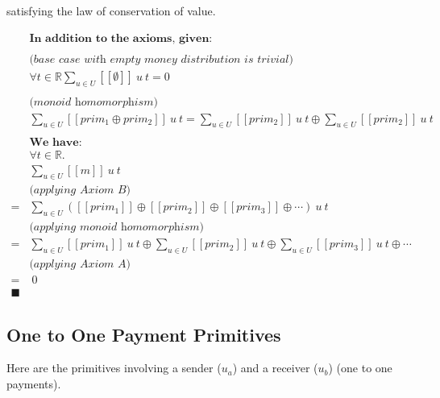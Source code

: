 satisfying the law of conservation of value.

\begin{equation}
    \begin{split}
        &\textbf{In addition to the axioms, given:} \\
        \\
        &\textit{(base case with empty money distribution is trivial)} \\
        &\forall t \in \mathbb{R} {\displaystyle \sum_{u \in U} [\![\emptyset]\!]\ u\ t = 0} \\
        \\
        &\textit{(monoid homomorphism)} \\
        &{\displaystyle \sum_{u \in U} [\![prim_1 \oplus prim_2]\!]\ u\ t} =
          {\displaystyle \sum_{u \in U} [\![prim_2]\!]\ u\ t} \oplus
          {\displaystyle \sum_{u \in U} [\![prim_2]\!]\ u\ t} \\
        \\
        &\textbf{We have:} \\
        &\forall t \in \mathbb{R}. \\
        &{\displaystyle \sum_{u \in U} [\![m]\!]\ u\ t} \\
        &\textit{(applying Axiom B)} \\
        = &{\displaystyle \sum_{u \in U}
            ([\![prim_1]\!] \oplus
            [\![prim_2]\!] \oplus
            [\![prim_3]\!]\oplus \dotsb)
        }\ u\ t
        \\
        &\textit{(applying monoid homomorphism)} \\
        = &{\displaystyle \sum_{u \in U} [\![prim_1]\!]\ u\ t} \oplus
        {\displaystyle \sum_{u \in U} [\![prim_2]\!]\ u\ t} \oplus
        {\displaystyle \sum_{u \in U} [\![prim_3]\!]\ u\ t} \oplus \dotsb
        \\
        &\textit{(applying Axiom A)} \\
        =&\ 0
        \\
        \blacksquare
    \end{split}
\end{equation}

\subsection{One to One Payment Primitives}

Here are the primitives involving a sender ($u_a$) and a receiver ($u_b$) (one to one payments).

